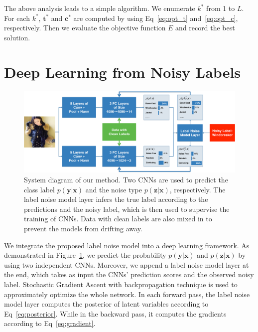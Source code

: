 \documentclass[10pt,twocolumn,letterpaper]{article}
\def\vec{\mathbf}
\begin{document}
The above analysis leads to a simple algorithm. We enumerate $k^*$ from 1 to $L$. For each $k^*$, $\vec{t}^*$ and $\vec{c}^*$ are computed by using Eq~\eqref{eq:opt_t} and~\eqref{eq:opt_c}, respectively. Then we evaluate the objective function $E$ and record the best solution.




\section{Deep Learning from Noisy Labels} %
\label{sec:deep_learning_from_noisy_labels}

\begin{figure}
\begin{center}
\includegraphics[width=0.9\linewidth]{figure/diagram.pdf}
\end{center}
\caption{System diagram of our method. Two CNNs are used to predict the class label $p(\vec{y}|\vec{x})$ and the noise type $p(\vec{z}|\vec{x})$, respectively. The label noise model layer infers the true label according to the predictions and the noisy label, which is then used to supervise the training of CNNs. Data with clean labels are also mixed in to prevent the models from drifting away.}
\label{fig:framework}
\end{figure}

We integrate the proposed label noise model into a deep learning framework. As demonstrated in Figure~\ref{fig:framework}, we predict the probability $p(\vec{y}|\vec{x})$ and $p(\vec{z}|\vec{x})$ by using two independent CNNs. Moreover, we append a label noise model layer at the end, which takes as input the CNNs' prediction scores and the observed noisy label. Stochastic Gradient Ascent with backpropagation technique is used to approximately optimize the whole network. In each forward pass, the label noise model layer computes the posterior of latent variables according to Eq~\eqref{eq:posterior}. While in the backward pass, it computes the gradients according to Eq~\eqref{eq:gradient}.
\end{document}

